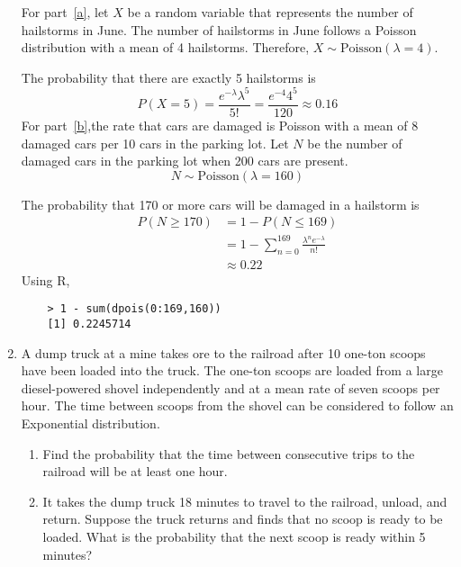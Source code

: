 \begin{enumerate}
\begin{solution}
	\bs For part~\ref{a}, let $X$ be a random variable that represents the number of hailstorms in June. The number of hailstorms in June follows a Poisson distribution with a mean of 4 hailstorms. Therefore, $X \sim \text{Poisson}(\lambda = 4)$.
	
	The probability that there are exactly 5 hailstorms is 
	\[
	P(X=5) = \frac{e^{-\lambda}\lambda^5}{5!} = \frac{e^{-4}4^5}{120} \approx 0.16
	\]
	For part~\ref{b},the rate that cars are damaged is Poisson with a mean of 8 damaged cars per 10 cars in the parking lot. Let $N$ be the number of damaged cars in the parking lot when 200 cars are present.
	\[ N \sim \text{Poisson}(\lambda = 160) \] 
	
	The probability that 170 or more cars will be damaged in a hailstorm is 
	\begin{align*}
		P(N \geq 170) &= 1 - P(N \leq 169) \\
		&= 1 - \sum_{n=0}^{169} \frac{\lambda^n e^{-\lambda}}{n!}\\
		&\approx 0.22
	\end{align*}
	Using R,
	\begin{Verbatim}
	> 1 - sum(dpois(0:169,160))
	[1] 0.2245714
	\end{Verbatim}
\end{solution}

\item A dump truck at a mine takes ore to the railroad after 10
  one-ton scoops have been loaded into the truck.  The one-ton scoops
  are loaded from a large diesel-powered shovel independently and at a
  mean rate of seven scoops per hour.  The time between scoops from the
  shovel can be considered to follow an Exponential distribution.

\begin{enumerate}
\item Find the probability that the time between consecutive trips to
  the railroad will be at least one hour.
\item It takes the dump truck 18 minutes to travel to the railroad,
  unload, and return. Suppose the truck returns and finds that no
  scoop is ready to be loaded. What is the probability that the next
  scoop is ready within 5 minutes? \label{item:2}
\end{enumerate}


\end{enumerate}
